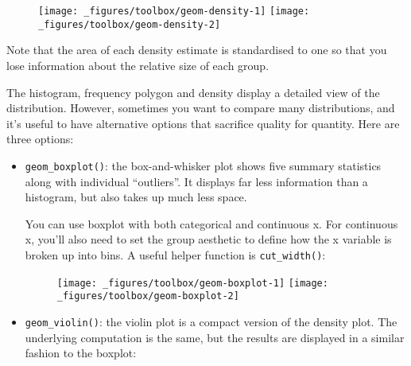 \begin{figure}[H]
  \texttt{[image: \_figures/toolbox/geom-density-1]}%
  \texttt{[image: \_figures/toolbox/geom-density-2]}
\end{figure}

Note that the area of each density estimate is standardised to one so
that you lose information about the relative size of each group.

The histogram, frequency polygon and density display a detailed view of
the distribution. However, sometimes you want to compare many
distributions, and it's useful to have alternative options that
sacrifice quality for quantity. Here are three options:

\begin{itemize}
\item
  \texttt{geom\_boxplot()}: the box-and-whisker plot shows five summary
  statistics along with individual ``outliers''. It displays far less
  information than a histogram, but also takes up much less space.
   

  You can use boxplot with both categorical and continuous x. For
  continuous x, you'll also need to set the group aesthetic to define
  how the x variable is broken up into bins. A useful helper function is
  \texttt{cut\_width()}: 

\begin{Shaded}
\begin{Highlighting}[]
\OperatorTok{+}\StringTok{ }
\StringTok{  }\NormalTok{()}
\OperatorTok{+}\StringTok{ }
\StringTok{  }\NormalTok{(}\NormalTok{(} \NormalTok{))) }\OperatorTok{+}\StringTok{ }
\StringTok{  }\NormalTok{(}\NormalTok{, }\NormalTok{)}
\end{Highlighting}
\end{Shaded}

  \begin{figure}[H]
    \texttt{[image: \_figures/toolbox/geom-boxplot-1]}%
    \texttt{[image: \_figures/toolbox/geom-boxplot-2]}
  \end{figure}
\item
  \texttt{geom\_violin()}: the violin plot is a compact version of the
  density plot. The underlying computation is the same, but the results
  are displayed in a similar fashion to the boxplot:
   


\end{itemize}
